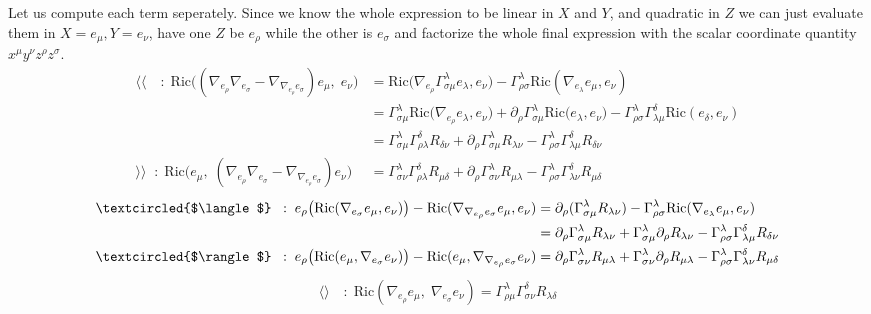 \documentclass[a4paper,11pt]{article}
\newcommand{\R}{{\mathrm{Ric}}}
\begin{document}
Let us compute each term seperately. Since we know the whole expression to be linear in $X$ and $Y$, and quadratic in $Z$ we can just evaluate them in $X=e_\mu,Y=e_\nu$, have one $Z$ be $e_\rho$ while the other is $e_\sigma$ and factorize the whole final expression with the scalar coordinate quantity $x^\mu y^\nu z^\rho z^\sigma$.
\begin{align*}
    \langle\langle \quad:\;
    \R\big((\nabla_{e_\rho}\nabla_{e_\sigma} - \nabla_{\nabla_{e_\rho}e_\sigma})e_\mu,\;e_\nu\big)
    &= \R\big(\nabla_{e_\rho}\Gamma_{\sigma\mu}^\lambda e_\lambda,e_\nu\big) - \Gamma_{\rho\sigma}^\lambda \R(\nabla_{e_\lambda}e_\mu,e_\nu)\\
    &=\Gamma_{\sigma\mu}^\lambda\R\big(\nabla_{e_\rho} e_\lambda,e_\nu\big) + \partial_\rho\Gamma_{\sigma\mu}^\lambda\R\big( e_\lambda,e_\nu\big)- \Gamma_{\rho\sigma}^\lambda \Gamma_{\lambda\mu}^\delta\R(e_\delta,e_\nu)\\
    &=\Gamma_{\sigma\mu}^\lambda\Gamma_{\rho\lambda}^\delta R_{\delta\nu} + \partial_\rho\Gamma_{\sigma\mu}^\lambda R_{\lambda\nu}- \Gamma_{\rho\sigma}^\lambda \Gamma_{\lambda\mu}^\delta R_{\delta\nu}\\
    \rangle\rangle \;\;:\;
    \R\big( e_\mu,\;(\nabla_{e_\rho}\nabla_{e_\sigma} - \nabla_{\nabla_{e_\rho}e_\sigma})e_\nu\big)
    &= \Gamma_{\sigma\nu}^\lambda \Gamma_{\rho\lambda}^\delta R_{\mu\delta} + \partial_\rho  \Gamma_{\sigma\nu}^\lambda R_{\mu\lambda}- \Gamma_{\rho\sigma}^\lambda \Gamma_{\lambda\nu}^\delta R_{\mu\delta}
\end{align*}
\begin{align*}
    \textcircled{$\langle$}\;\;: \; e_\rho\big(\R(\nabla_{e_\sigma} e_\mu, e_\nu)\big) - \R(\nabla_{\nabla_{e_\rho}e_\sigma} e_\mu, e_\nu)
    &= \partial_\rho (\Gamma_{\sigma\mu}^\lambda R_{\lambda\nu}) - \Gamma_{\rho\sigma}^\lambda \R(\nabla_{e_\lambda}e_\mu,e_\nu)\\
    &= \partial_\rho \Gamma_{\sigma\mu}^\lambda R_{\lambda\nu} + \Gamma_{\sigma\mu}^\lambda \partial_\rho R_{\lambda\nu} - \Gamma_{\rho\sigma}^\lambda \Gamma_{\lambda\mu}^\delta R_{\delta\nu}\\
    \textcircled{$\rangle$}\;\;: \; e_\rho\big(\R(e_\mu, \nabla_{e_\sigma} e_\nu)\big) - \R(e_\mu, \nabla_{\nabla_{e_\rho}e_\sigma} e_\nu)
    &= \partial_\rho \Gamma_{\sigma\nu}^\lambda R_{\mu\lambda} + \Gamma_{\sigma\nu}^\lambda \partial_\rho R_{\mu\lambda} - \Gamma_{\rho\sigma}^\lambda \Gamma_{\lambda\nu}^\delta R_{\mu\delta}
\end{align*}
\begin{align*}
\langle\rangle \quad:\;
    \R(\nabla_{e_\rho} e_\mu,\;\nabla_{e_\sigma} e_\nu)
    = \Gamma_{\rho\mu}^\lambda\Gamma_{\sigma\nu}^\delta R_{\lambda\delta}
\end{align*}
\end{document}
